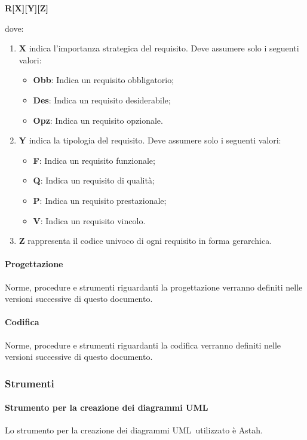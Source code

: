 \documentclass[../NormeProgetto.tex]{subfiles}
\begin{document}
				\begin{center}\textbf{R[X][Y][Z]}\end{center} dove:
					\begin{enumerate}
						\item \textbf{X} indica l'importanza strategica del requisito. Deve assumere solo i seguenti valori:
						\begin{itemize}
							\item \textbf{Obb}: Indica un requisito obbligatorio;
							\item \textbf{Des}: Indica un requisito desiderabile;
							\item \textbf{Opz}: Indica un requisito opzionale.
						\end{itemize}
						\item \textbf{Y} indica la tipologia del requisito. Deve assumere solo i seguenti valori:
						\begin{itemize}
							\item \textbf{F}: Indica un requisito funzionale;
							\item \textbf{Q}: Indica un requisito di qualità;
							\item \textbf{P}: Indica un requisito prestazionale;
							\item \textbf{V}: Indica un requisito vincolo.
						\end{itemize}
						\item \textbf{Z} rappresenta il codice univoco di ogni requisito in forma gerarchica.
					\end{enumerate}
			\paragraph{Progettazione}
			Norme, procedure e strumenti riguardanti la progettazione verranno definiti nelle versioni successive di questo documento.
			\paragraph{Codifica}
			Norme, procedure e strumenti riguardanti la codifica verranno definiti nelle versioni successive di questo documento.
		\subsubsection{Strumenti}
			\paragraph{Strumento per la creazione dei diagrammi UML}
			Lo strumento per la creazione dei diagrammi UML\g\ utilizzato è Astah\g.
\end{document}
